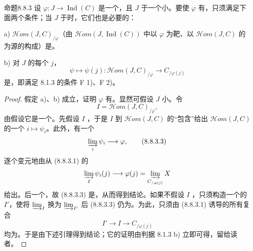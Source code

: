 \begin{SGAresult}{命题}{8.8.3}
设 $\varphi:J\to\operatorname{Ind}(C)$ 是一个，且 $J$ 于一个小。要使 $\varphi$ 有，只须满足下面两个条件；当 $J$ 于时，它们也是必要的：

 a)  $\mathscr{H}\!om(J,C)_{/\varphi}$（由 $\mathscr{H}\!om(J,\operatorname{Ind}(C))$ 中以 $\varphi$ 为靶、以 $\mathscr{H}\!om(J,C)$ 的为源的构成）是。

 b) 对 $J$ 的每个 $j$，
\[
\psi\longmapsto\psi(j):\mathscr{H}\!om(J,C)_{/\varphi}
\longrightarrow C_{/\varphi(j)}\tag{8.8.3.1}
\]
是，即满足 8.1.3 的条件 F 1)、F 2)。
\end{SGAresult}
\begin{proof}
假定 a)、b) 成立，证明 $\varphi$ 有。显然可假设 $J$ 小。令
\[
I=\mathscr{H}\!om(J,C)_{/\varphi},\tag{8.8.3.2}
\]
由假设它是一个。先假设 $I$ ，于是 $I$ 到 $\mathscr{H}\!om(J,C)$ 的“包含”给出 $\mathscr{H}\!om(J,C)$ 的一个 $i\mapsto\psi_i$。此外，有一个
\[
\varinjlim_i\psi_i\longrightarrow\varphi,\tag{8.8.3.3}
\]
逐个变元地由从 (8.8.3.1) 的
\[
\varinjlim_I\psi_i(j)\longrightarrow\varphi(j)
=\varinjlim_{C_{/\varphi(j)}}X
\]
给出。后一个，故 (8.8.3.3) 是，从而得到结论。如果不假设 $I$ ，只须构造一个的 $I'$，使将 $\varinjlim_I$ 换为 $\varinjlim_{I'}$ 后 (8.8.3.3) 仍为。为此，只须由 (8.8.3.1) 诱导的所有复合
\[
I'\longrightarrow I\longrightarrow C_{/\varphi(j)}
\]
均为。于是由下述引理得到结论；它的证明由判据 8.1.3 b) 立即可得，留给读者。
\end{proof}

